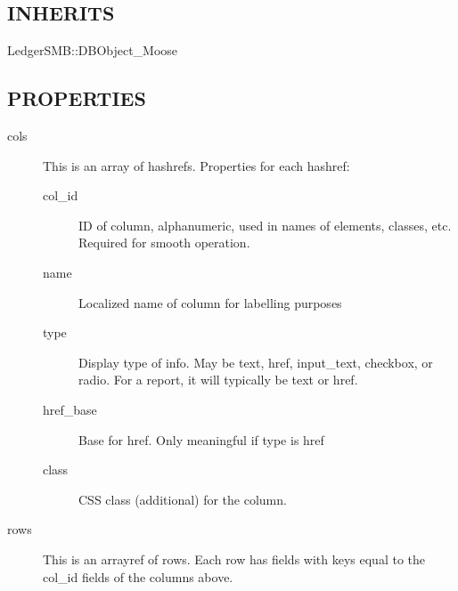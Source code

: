 \begin{description}
\begin{description}
\begin{description}
\begin{description}
\begin{description}
\begin{description}
\end{description}
\subsection*{INHERITS\label{LedgerSMB::DBObject::Report_INHERITS}}
\begin{description}

\item[{LedgerSMB::DBObject\_Moose}] \mbox{}\end{description}
\subsection*{PROPERTIES\label{LedgerSMB::DBObject::Report_PROPERTIES}}
\begin{description}

\item[{cols}] \mbox{}

This is an array of hashrefs.  Properties for each hashref:

\begin{description}

\item[{col\_id}] \mbox{}

ID of column, alphanumeric, used in names of elements, classes, etc.  Required
for smooth operation.


\item[{name}] \mbox{}

Localized name of column for labelling purposes


\item[{type}] \mbox{}

Display type of info.  May be text, href, input\_text, checkbox, or radio.  For a
report, it will typically be text or href.


\item[{href\_base}] \mbox{}

Base for href.  Only meaningful if type is href


\item[{class}] \mbox{}

CSS class (additional) for the column.

\end{description}

\item[{rows}] \mbox{}

This is an arrayref of rows.  Each row has fields with keys equal to the col\_id
fields of the columns above.



\end{description}
\end{description}
\end{description}
\end{description}
\end{description}
\end{description}
